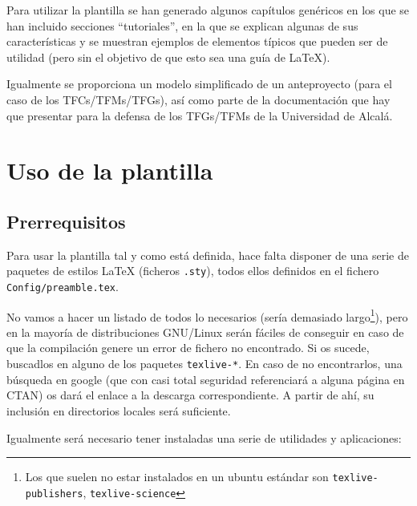 Para utilizar la plantilla se han generado algunos capítulos genéricos en los que se han incluido secciones ``tutoriales'', en la que se explican algunas de sus características y se muestran ejemplos de elementos típicos que pueden ser de utilidad (pero sin el objetivo de que esto sea una guía de \LaTeX{}).

Igualmente se proporciona un modelo simplificado de un anteproyecto (para el caso de los TFCs/TFMs/TFGs), así como parte de la documentación que hay que presentar para la defensa de los TFGs/TFMs de la Universidad de Alcalá.



\section{Uso de la plantilla}
\label{sec:uso-generico-de}


\subsection{Prerrequisitos}
\label{sec:prerrequisitos}

Para usar la plantilla tal y como está definida, hace falta disponer de una serie de paquetes de estilos \LaTeX{} (ficheros \texttt{.sty}), todos ellos definidos en el fichero \texttt{Config/preamble.tex}.

No vamos a hacer un listado de todos lo necesarios (sería demasiado largo\footnote{Los que suelen no estar instalados en un ubuntu estándar son \texttt{texlive-publishers}, \texttt{texlive-science}}), pero en la mayoría de distribuciones GNU/Linux serán fáciles de conseguir en caso de que la compilación genere un error de fichero no encontrado. Si os sucede, buscadlos en alguno de los paquetes \texttt{texlive-*}. En caso de no encontrarlos, una búsqueda en google (que con casi total seguridad referenciará a alguna página en CTAN) os dará el enlace a la descarga correspondiente. A partir de ahí, su inclusión en directorios locales será suficiente.

Igualmente será necesario tener instaladas una serie de utilidades y aplicaciones:

